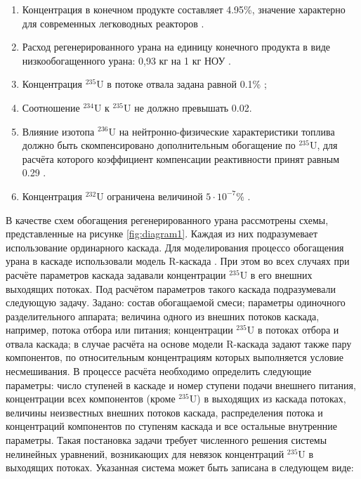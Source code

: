 \begin{enumerate}
  \item Концентрация в конечном продукте составляет 4.95\%, значение характерно для современных легководных реакторов \cite{solovevaCennostiOYaTKak2019}.
  \item Расход регенерированного урана на единицу конечного продукта в виде низкообогащенного урана: 0,93 кг на 1 кг НОУ \cite{smirnovApplyingEnrichmentCapacities2018}.
  \item Концентрация $^{235}$U в потоке отвала задана равной 0.1\% \cite{smirnovEvolutionIsotopicComposition2012};
  \item Соотношение $^{234}$U к $^{235}$U не должно превышать 0.02.
  \item Влияние изотопа $^{236}$U на нейтронно-физические характеристики топлива должно быть скомпенсировано дополнительным обогащение по $^{235}$U, для расчёта которого коэффициент компенсации реактивности принят равным 0.29 \cite{smirnovApplyingEnrichmentCapacities2018}.
  \item Концентрация $^{232}$U ограничена величиной $5\cdot10^{-7}$\% \cite{smirnovApplyingEnrichmentCapacities2018}.
\end{enumerate}

В качестве схем обогащения регенерированного урана рассмотрены схемы, представленные на рисунке \ref{fig:diagram1}.
Каждая из них подразумевает использование ординарного каскада. Для моделирования процессо обогащения урана в каскаде использовали модель R-каскада \cite{sulaberidzeTeoriyaKaskadovDlya2011}. При этом во всех случаях при расчёте параметров каскада задавали концентрации $^{235}$U в его внешних выходящих потоках. Под расчётом параметров такого каскада подразумевали следующую задачу. 
Задано: состав обогащаемой смеси; параметры одиночного разделительного аппарата; величина одного из внешних потоков каскада, например, потока отбора или питания; концентрации $^{235}$U в потоках отбора и отвала каскада; в случае расчёта на основе модели R-каскада задают также пару компонентов, по относительным концентрациям которых выполняется условие несмешивания.
В процессе расчёта необходимо определить следующие параметры: число ступеней в каскаде и номер ступени подачи внешнего питания, концентрации всех компонентов (кроме $^{235}$U) в выходящих из каскада потоках, величины неизвестных внешних потоков каскада, распределения потока и концентраций компонентов по ступеням каскада и все остальные внутренние параметры. 
Такая постановка задачи требует численного решения системы нелинейных уравнений, возникающих для невязок концентраций $^{235}$U в выходящих потоках. Указанная система может быть записана в следующем виде: 

